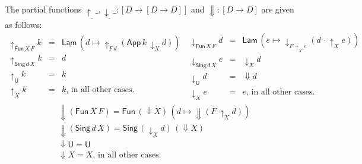 \documentclass{LMCS}
\theoremstyle{plain}\newtheorem{satz}[thm]{Satz}
\newcommand{\LONGVERSION}[1]{#1}
\newcommand{\SHORTVERSION}[1]{}
\newcommand{\into}{\rightarrow}
\newcommand{\Da}[1]{\mathop{\Downarrow} #1}
\newcommand{\upa}[2]{\mathop{\uparrow}\nolimits_{#1}{#2}}
\newcommand{\da}[2]{\mathop{\downarrow}\nolimits_{#1}{#2}}
\newcommand{\iLam}[1]{\mathsf{Lam}\,#1}
\newcommand{\iNe}[2]{\mathsf{App}\,#1\,#2}
\newcommand{\iU}{\mathsf{U}}
\newcommand{\iPi}[2]{\mathsf{Fun}\,#1\,#2}
\newcommand{\iSing}[2]{\mathsf{Sing}\,#1\,{#2}}
\newcommand{\LONGVERSION}[1]{}
\newcommand{\SHORTVERSION}[1]{#1}
\newcommand{\LONGSHORT}[2]{\LONGVERSION{#1}\SHORTVERSION{#2}}
\begin{document}
\LONGSHORT{
\begin{defi}
  \label{def:up-down}
  The partial functions $\upa{\_}{\_},\da{\_}{\_} : [D \into
  [D\into D]]$ and $\Da{} : [D \into D]$ are given as follows: 
\[
  \begin{array}{rcl}
    \upa{\iPi{X}{F}}{k} & = &  \iLam{(d \mapsto \upa{F\, d}{(\iNe {k}{\da{X}{d}})})}  \\
    \upa{\iSing{d}{X}}{k}& = & d \\
    \upa{\iU}{k} & = &  k \\
    \upa{X}{k} & = & k\mbox{, in all other cases.}
  \end{array}
\
  \begin{array}{rcl}
    \da{\iPi{X}{F}}{d} & = & \iLam{(e \mapsto \da{F\, \upa{X}{e}}{(d\,\cdot \upa{X}{e})})}  \\
    \da{\iSing{d}{X}}{e} & = & \da{X}{d} \\
    \da{\iU}{d} & = &  \Da{d} \\
    \da{X}{e} & = & e \mbox{, in all other cases.}
  \end{array}
\]
\begin{align*}
    &\Da{(\iPi{X}{F})}   = \iPi{(\Da{X})}{(d \mapsto \Da{(F\, \upa{X}{d})})} & \\
    &\Da{(\iSing{d}{X})} = \iSing{(\da{X}{d})}{(\Da{X})}& \\
    &\Da{\iU} =  \iU& \\
    &\Da{X}  = X\mbox{, in all other cases.}&
  \end{align*}
\end{defi}
}{
\begin{defi}
  \label{def:up-down}
  The partial functions $\upa{\_}{\_},\da{\_}{\_} : D \into
  D\into D$ and $\Da{} : D \into D$ are given as follows: 
  \begin{align*}
    \upa{\iPi{X}{F}}{d}&= \iLam{(e \mapsto \upa{F\,e}{(\iNe
        {d}{\da{X}{e}})})} &
    \da{\iPi{X}{F}}{d}&= \iLam{(e \mapsto 
        \da{F\,\upa{X}{e}}{(d\,\cdot \upa{X}{e})})} & \\
    \upa{\iSing{d}{X}}{e}&= d&
    \da{\iSing{d}{X}}{e}&= \da{X}{d}& \\
    \upa{\iU}{d}&= d&
    \da{\iU}{d}&=\Da{d}& \\
    \upa{d}{e}&= e& \da{d}{e}&= e\mbox{, in all other cases.} &
  \end{align*}
  \begin{align*}
    \Da{(\iPi{X}{F})}   &= \iPi{(\Da{X})}{(d \mapsto \Da{(F\,\upa{X}{d})})} &
    \Da{\iU} &=  \iU& \\
    \Da{(\iSing{d}{X})} &= \iSing{(\da{X}{d})}{(\Da{X})}& 
    \Da{d} &= d\mbox{, in all other cases.}&
  \end{align*}
\end{defi}
}\medskip
\end{document}
